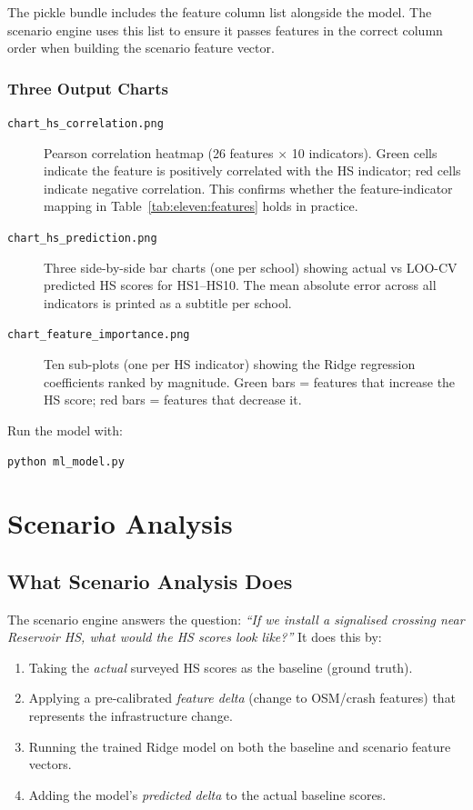 \documentclass[11pt,a4paper,openany]{book}
\begin{document}
The pickle bundle includes the feature column list alongside the model. The scenario engine uses this list to ensure it passes features in the correct column order when building the scenario feature vector.

\subsection{Three Output Charts}

\begin{description}
  \item[\texttt{chart\_hs\_correlation.png}] Pearson correlation heatmap (26 features $\times$ 10 indicators). Green cells indicate the feature is positively correlated with the HS indicator; red cells indicate negative correlation. This confirms whether the feature-indicator mapping in Table~\ref{tab:eleven:features} holds in practice.
  \item[\texttt{chart\_hs\_prediction.png}] Three side-by-side bar charts (one per school) showing actual vs LOO-CV predicted HS scores for HS1--HS10. The mean absolute error across all indicators is printed as a subtitle per school.
  \item[\texttt{chart\_feature\_importance.png}] Ten sub-plots (one per HS indicator) showing the Ridge regression coefficients ranked by magnitude. Green bars = features that increase the HS score; red bars = features that decrease it.
\end{description}

Run the model with:
\begin{lstlisting}[style=bash]
python ml_model.py
\end{lstlisting}

\chapter{Scenario Analysis}

\section{What Scenario Analysis Does}

The scenario engine answers the question: \emph{``If we install a signalised crossing near Reservoir HS, what would the HS scores look like?''} It does this by:

\begin{enumerate}
  \item Taking the \emph{actual} surveyed HS scores as the baseline (ground truth).
  \item Applying a pre-calibrated \emph{feature delta} (change to OSM/crash features) that represents the infrastructure change.
  \item Running the trained Ridge model on both the baseline and scenario feature vectors.
  \item Adding the model's \emph{predicted delta} to the actual baseline scores.
\end{enumerate}
\end{document}
